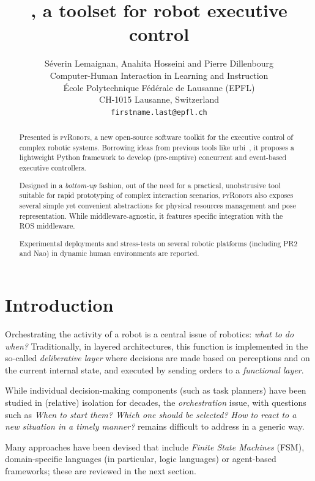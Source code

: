 \documentclass[a4paper, 10pt, conference]{ieeeconf}      %
\title{\LARGE \bf
    \pyRobots{}, a toolset for robot executive control
}
\author{Séverin Lemaignan, Anahita Hosseini and Pierre Dillenbourg\\
Computer-Human Interaction in Learning and Instruction \\
École Polytechnique Fédérale de Lausanne (EPFL) \\
CH-1015 Lausanne, Switzerland \\
{\tt\small firstname.last@epfl.ch}
}
\newcommand{\pyRobots}{\textsc{pyRobots}}
\begin{document}
\maketitle
\thispagestyle{empty}
\pagestyle{empty}


\begin{abstract}

Presented is \pyRobots{}, a new open-source software toolkit for the executive
control of complex robotic systems. Borrowing ideas from previous tools like
{\sc urbi}~\cite{baillie2005urbi}, it proposes a lightweight Python framework to
develop (pre-emptive) concurrent and event-based executive controllers.

Designed in a \emph{bottom-up} fashion, out of the need for a practical,
unobstrusive tool suitable for rapid prototyping of complex interaction
scenarios, \pyRobots{} also exposes several simple yet convenient abstractions
for physical resources management and pose representation. While
middleware-agnostic, it features specific integration with the ROS middleware.

Experimental deployments and stress-tests on several robotic platforms
(including PR2 and Nao) in dynamic human environments are reported.

\end{abstract}


\section{Introduction}

Orchestrating the activity of a robot is a central issue of robotics: \emph{what
to do when?} Traditionally, in layered architectures, this function is
implemented in the so-called \emph{deliberative layer} where decisions are made
based on perceptions and on the current internal state, and executed by sending
orders to a \emph{functional layer}.

While individual decision-making components (such as task planners) have been
studied in (relative) isolation for decades, the \emph{orchestration} issue,
with questions such as \textit{When to start them? Which one should be selected?
How to react to a new situation in a timely manner?} remains difficult to
address in a generic way.

Many approaches have been devised that
include \emph{Finite State Machines} (FSM), domain-specific languages (in
particular, logic languages) or agent-based frameworks; these are reviewed in
the next section.
\end{document}
